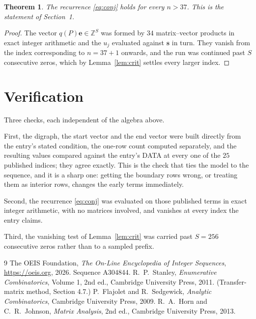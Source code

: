 \documentclass[11pt,a4paper]{article}
\theoremstyle{plain}
\newtheorem{theorem}{Theorem}
\theoremstyle{definition}
\begin{document}
\begin{theorem}
The recurrence \eqref{eq:conj} holds for every $n>37$. This is the statement of
Section~1.
\end{theorem}

\begin{proof}
The vector $q(P)\mathbf{e}\in\mathbb{Z}^{S}$ was formed by $34$ matrix--vector
products in exact integer arithmetic and the $u_j$ evaluated against $\mathbf{s}$ in turn.
They vanish from the index corresponding to $n=37+1$ onwards, and the run was continued
past $S$ consecutive zeros, which by Lemma~\ref{lem:crit} settles every larger index.
\end{proof}

\section{Verification}

Three checks, each independent of the algebra above.

First, the digraph, the start vector and the end vector were built directly from the
entry's stated condition, the one-row count computed separately, and the resulting values
compared against the entry's DATA at every one of the $25$ published indices; they
agree exactly. This is the check that ties the model to the sequence, and it is a sharp one:
getting the boundary rows wrong, or treating them as interior rows, changes the early terms
immediately.

Second, the recurrence \eqref{eq:conj} was evaluated on those published terms in exact
integer arithmetic, with no matrices involved, and vanishes at every index the entry claims.

Third, the vanishing test of Lemma~\ref{lem:crit} was carried past $S=256$ consecutive
zeros rather than to a sampled prefix.

\begin{thebibliography}{9}
 The OEIS Foundation, \emph{The On-Line Encyclopedia of Integer
Sequences}, \url{https://oeis.org}, 2026. Sequence A304844.
 R.~P.~Stanley, \emph{Enumerative Combinatorics}, Volume 1, 2nd ed.,
Cambridge University Press, 2011. (Transfer-matrix method, Section 4.7.)
 P.~Flajolet and R.~Sedgewick, \emph{Analytic Combinatorics}, Cambridge
University Press, 2009.
 R.~A.~Horn and C.~R.~Johnson, \emph{Matrix Analysis}, 2nd ed., Cambridge
University Press, 2013.
\end{thebibliography}
\end{document}
